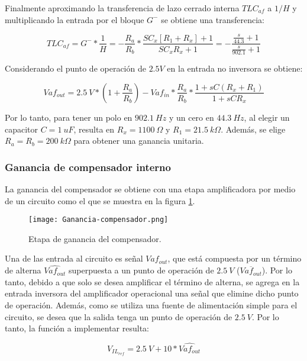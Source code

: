 Finalmente aproximando la transferencia de lazo cerrado interna $TLC_{af}$ a $1/H$ y multiplicando la entrada por el bloque $G^-$ se obtiene una transferencia:

\begin{equation} 
	TLC_{af} = G^- * \frac{1}{H}  =- \frac{R_a}{R_b} * \frac{SC_x[R_1+R_x]+1}{SC_xR_x+1}=-\frac{\frac{s}{44.3}+1}{\frac{s}{902.1}+1}
\end{equation}
 

Considerando el punto de operación de $2.5V$ en la entrada no inversora se obtiene:

\begin{equation} 
	Vaf_{out}= 2.5\:V* (1+\frac{R_a}{R_b})- Vaf_{in}*\frac{R_a}{R_b}*\frac{1+sC(R_x+R_1)}{1+sCR_x}
\end{equation}

Por lo tanto, para tener un polo en $902.1\:Hz$ y un cero en $44.3\:Hz$, al elegir un capacitor $C = 1\:uF$, resulta en $R_x = 1100\:\Omega$ y $R_1 = 21.5\:k\Omega$. Además, se elige $R_a = R_b = 200\:k\Omega$ para obtener una ganancia unitaria. 

\subsubsection{Ganancia de compensador interno}

La ganancia del compensador se obtiene con una etapa amplificadora por medio de un circuito como el que se muestra en la figura \ref{fig:ganancia-compensador}.

\begin{figure}[H]
	\centering
	\texttt{[image: Ganancia-compensador.png]}
	\caption{Etapa de ganancia del compensador.}
	\label{fig:ganancia-compensador}
\end{figure}

Una de las entrada al circuito es señal $Vaf_{out}$, que está compuesta por un término de alterna $\hat{Vaf_{out}}$ superpuesta a un punto de operación de $2.5\:V$ ($\overline{Vaf_{out}}$). Por lo tanto, debido a que solo se desea amplificar el término de alterna, se agrega en la entrada inversora del amplificador operacional una señal que elimine dicho punto de operación. Además, como se utiliza una fuente de alimentación simple para el circuito, se desea que la salida tenga un punto de operación de $2.5\:V$. Por lo tanto, la función a implementar resulta:

\begin{equation} \label{eq_sum_int_1}
	V_{IL_{ref}}=2.5\:V+10*\hat{Vaf_{out}}
\end{equation}

